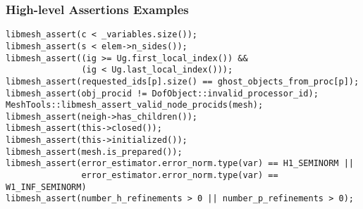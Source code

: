 \begin{frame}[fragile]
\frametitle{High-level Assertions Examples}
{\footnotesize
\begin{verbatim}
libmesh_assert(c < _variables.size());
libmesh_assert(s < elem->n_sides());
libmesh_assert((ig >= Ug.first_local_index()) &&
               (ig < Ug.last_local_index()));
libmesh_assert(requested_ids[p].size() == ghost_objects_from_proc[p]);
libmesh_assert(obj_procid != DofObject::invalid_processor_id);
MeshTools::libmesh_assert_valid_node_procids(mesh);
libmesh_assert(neigh->has_children());
libmesh_assert(this->closed());
libmesh_assert(this->initialized());
libmesh_assert(mesh.is_prepared());
libmesh_assert(error_estimator.error_norm.type(var) == H1_SEMINORM ||
               error_estimator.error_norm.type(var) == W1_INF_SEMINORM)
libmesh_assert(number_h_refinements > 0 || number_p_refinements > 0);
\end{verbatim}
}
\end{frame}

